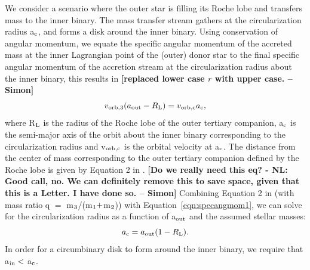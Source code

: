 \documentclass{aastex62}
\def\simon#1{{\bf {\color{red}[#1 -- Simon]}}}
\begin{document}
We consider a scenario where the outer star is filling its Roche lobe
and transfers mass to the inner binary.  The mass transfer stream
gathers at the circularization radius a$_{\rm c}$, and forms a disk
around the inner binary.  Using conservation of angular momentum, we
equate the specific angular momentum of the accreted mass at the inner
Lagrangian point of the (outer) donor star to the final specific
angular momentum of the accretion stream at the circularization radius
about the inner binary, this results in
\simon{replaced lower case $r$ with upper case.}
\begin{equation}
\label{eqn:specangmom1}
v_{\rm orb,3}(a_{\rm out} - R_{\rm L}) = v_{\rm orb,c}a_{\rm c},
\end{equation}
where R$_{\rm L}$ is the radius of the Roche lobe of the outer
tertiary companion, a$_{\rm c}$ is the semi-major axis of the orbit
about the inner binary corresponding to the circularization radius and
v$_{\rm orb,c}$ is the orbital velocity at a$_{\rm c}$.  The distance
from the center of mass corresponding to the outer tertiary companion
defined by the Roche lobe is given by Equation 2 in \citep{eggleton83}.
\simon{Do we really need this eq? - NL: Good call, no.  We can definitely remove this to save space, given that this is a Letter.  I have done so.}
Combining Equation 2 in \citet{eggleton83} (with mass ratio q $=$ m$_{\rm 3}$/(m$_{\rm 1} +$m$_{\rm 2}$)) with
Equation~\ref{eqn:specangmom1}, we can solve for the circularization
radius as a function of a$_{\rm out}$ and the assumed stellar masses:
\begin{equation}
\label{eqn:ac}
a_{\rm c} = a_{\rm out}(1 - R_{\rm L}).
\end{equation}
In order for a circumbinary disk to form around the inner binary, we
require that a$_{\rm in} <$ a$_{\rm c}$.
\end{document}
